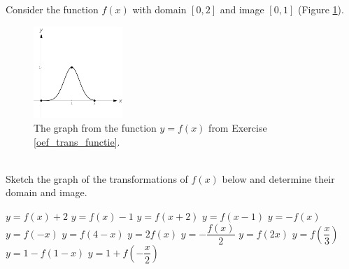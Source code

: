 

\begin{Exercise} [label = oef_trans_functie] Consider the function $f(x)$ with domain $[0,2]$ and image $[0,1]$ (Figure \ref{fig_functions_43}).
		\begin{figure}[h!]
		\begin{center}
			\includegraphics[width=0.3\textwidth]{fig_functions_43}
			\caption{The graph from the function $y=f(x)$ from Exercise \ref{oef_trans_functie}.}
			\label{fig_functions_43}
		\end{center}
		\end{figure} \\
Sketch the graph of the transformations of $f(x)$ below and determine their domain and image.
		\begin{multicols}{3}
			\Question[difficulty = 1] $y=f(x)+2$
			\Question[difficulty = 1] $y=f(x)-1$
			\Question[difficulty = 1] $y=f(x+2)$
			\Question[difficulty = 1] $y=f(x-1)$
			\Question[difficulty = 1] $y=-f(x)$
			\Question[difficulty = 1] $y=f(-x)$
			\Question[difficulty = 1] $y=f(4-x)$
			\Question[difficulty = 1] $y=2f(x)$
			\Question[difficulty = 1] $y=-\dfrac{f(x)}{2}$
			\Question[difficulty = 1] $y=f(2x)$
			\Question[difficulty = 1] $y=f\left(\dfrac{x}{3}\right)$
			\Question[difficulty = 2] $y=1-f(1-x)$
			\Question[difficulty = 2] $y=1+f\left(-\dfrac{x}{2}\right)$
			\EndCurrentQuestion
		\end{multicols}
\end{Exercise}

